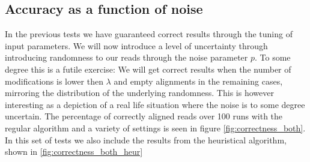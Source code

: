 \documentclass[thesis.tex]{subfiles}
\begin{document}
\subsection*{Accuracy as a function of noise}
In the previous tests we have guaranteed correct results through the tuning of input parameters. We will now introduce a level of uncertainty through introducing randomness to our reads through the noise parameter $p$. To some degree this is a futile exercise: We will get correct results when the number of modifications is lower then $\lambda$ and empty alignments in the remaining cases, mirroring the distribution of the underlying randomness. This is however interesting as a depiction of a real life situation where the noise is to some degree uncertain. The percentage of correctly aligned reads over 100 runs with the regular algorithm and a variety of settings is seen in figure \ref{fig:correctness_both}. In this set of tests we also include the results from the heuristical algorithm, shown in \ref{fig:correctness_both_heur}
\end{document}
